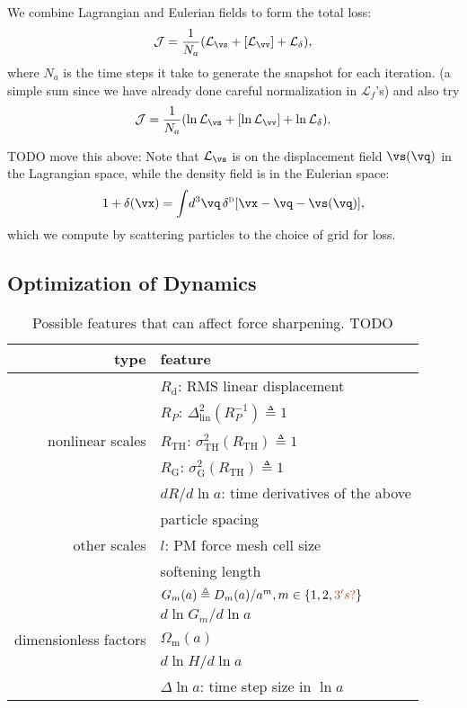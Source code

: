\documentclass[usenatbib]{mnras}
\newcommand{\deltaD}{\delta^\textsc{d}}
\renewcommand{\d}{d}
\newcommand{\cJ}{\mathcal{J}}
\newcommand{\cL}{\mathcal{L}}
\newcommand{\lna}{\ln\!a}
\newcommand{\Omegam}{\Omega_\mathrm{m}}
\newcommand{\linear}{\mathrm{lin}}
\newcommand{\tophat}{\mathrm{TH}}
\newcommand{\gauss}{\mathrm{G}}
\newcommand{\YL}[1]{\textcolor{Bittersweet}{#1}}
\begin{document}
We combine Lagrangian and Eulerian fields to form the total loss:
%
\begin{equation}
\cJ = \frac1{N_a} (\cL_\vs + [\cL_\vv] + \cL_\delta),
\end{equation}
%
where $N_a$ is the time steps it take to generate the snapshot for each
iteration.
\YL{(a simple sum since we have already done careful normalization in
$\cL_f$'s) and also try}
%
\begin{equation}
\cJ = \frac1{N_a} (\ln\cL_\vs + [\ln\cL_\vv] + \ln\cL_\delta).
\end{equation}
%

\YL{TODO move this above:}
Note that $\cL_\vs$ is on the displacement field $\vs(\vq)$ in the
Lagrangian space, while the density field is in the Eulerian space:
%
\begin{equation}
1 + \delta(\vx) = \int\!\d^3\vq\, \deltaD[ \vx - \vq - \vs(\vq)],
\end{equation}
%
which we compute by scattering particles to the choice of grid for loss.


\subsection{Optimization of Dynamics}
\label{sec:so}

\begin{table}
\centering
\caption{Possible features that can affect force sharpening. TODO}
\label{tab:feat}
\begin{tabular}{rl}
\toprule
type & feature \\
\midrule
& $R_\mathrm{d}$: RMS linear displacement \\
\cmidrule(lr){2-2}
& $R_P$: $\Delta_\linear^2(R_P^{-1}) \triangleq 1$ \\
\cmidrule(lr){2-2}
nonlinear scales & $R_\tophat$: $\sigma_\tophat^2(R_\tophat) \triangleq 1$ \\
\cmidrule(lr){2-2}
& $R_\gauss$: $\sigma_\gauss^2(R_\tophat) \triangleq 1$ \\
\cmidrule(lr){2-2}
& $\d R / \d\lna$: time derivatives of the above \\
\midrule
& particle spacing \\
\cmidrule(lr){2-2}
other scales & $l$: PM force mesh cell size \\
\cmidrule(lr){2-2}
& softening length \\
\midrule
& $G_m(a) \triangleq D_m(a) / a^m, m \in \{1, 2, \YL{3's?}\}$ \\
\cmidrule(lr){2-2}
& $\d\ln G_m / \d\lna$ \\
\cmidrule(lr){2-2}
dimensionless factors & $\Omegam(a)$ \\
\cmidrule(lr){2-2}
& $\d\ln\!H / \d\lna$ \\
\cmidrule(lr){2-2}
& $\Delta\lna$: time step size in $\lna$ \\
\bottomrule
\end{tabular}
\end{table}
\end{document}

